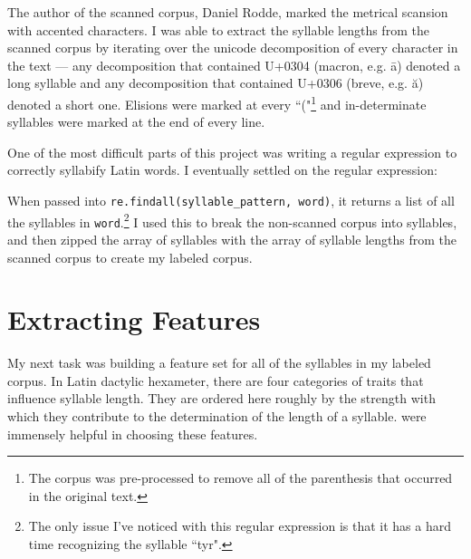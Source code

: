 \documentclass[12pt]{article}
\begin{document}
The author of the scanned corpus, Daniel Rodde, marked the metrical scansion with accented characters. I was able to extract the syllable lengths from the scanned corpus by iterating over the unicode decomposition of every character in the text --- any decomposition that contained U+0304 (macron, e.g. \={a}) denoted a long syllable and any decomposition that contained U+0306 (breve, e.g. \u{a}) denoted a short one. Elisions were marked at every ``("\footnote{The corpus was pre-processed to remove all of the parenthesis that occurred in the original text.} and in-determinate syllables were marked at the end of every line.

One of the most difficult parts of this project was writing a regular expression to correctly syllabify Latin words. I eventually settled on the regular expression:

When passed into \texttt{re.findall(syllable\_pattern, word)}, it returns a list of all the syllables in \texttt{word}.\footnote{The only issue I've noticed with this regular expression is that it has a hard time recognizing the syllable ``tyr".} I used this to break the non-scanned corpus into syllables, and then zipped the array of syllables with the array of syllable lengths from the scanned corpus to create my labeled corpus. 

\section*{Extracting Features}
My next task was building a feature set for all of the syllables in my labeled corpus. In Latin dactylic hexameter, there are four categories of traits that influence syllable length. They are ordered here roughly by the strength with which they contribute to the determination of the length of a syllable. \cite{Farrell1999, Boyd2009} were immensely helpful in choosing these features. 
\end{document}
